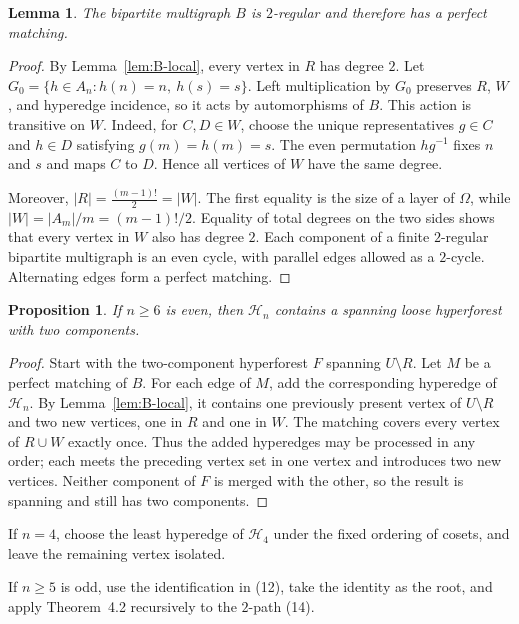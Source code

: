\documentclass[4pt]{article} %
\newtheorem{lemma}[theorem]{Lemma}
\newtheorem{proposition}[theorem]{Proposition}
\begin{document}
\begin{lemma}\label{lem:B-regular}
The bipartite multigraph $B$ is $2$-regular and therefore has a perfect
matching.
\end{lemma}

\begin{proof}
By Lemma~\ref{lem:B-local}, every vertex in $R$ has degree $2$. Let
$
 G_0=\{h\in A_n:h(n)=n,\ h(s)=s\}.
$
Left multiplication by $G_0$ preserves $R$, $W$, and hyperedge incidence,
so it acts by automorphisms of $B$. This action is transitive on $W$.
Indeed, for $C,D\in W$, choose the unique representatives $g\in C$ and
$h\in D$ satisfying $g(m)=h(m)=s$. The even permutation $hg^{-1}$ fixes
$n$ and $s$ and maps $C$ to $D$. Hence all vertices of $W$ have the same
degree.

Moreover,
$
 |R|=\frac{(m-1)!}{2}=|W|.
$
The first equality is the size of a layer of $\Omega$, while
$|W|=|A_m|/m=(m-1)!/2$. Equality of total degrees on the two sides shows
that every vertex in $W$ also has degree $2$. Each component of a finite
$2$-regular bipartite multigraph is an even cycle, with parallel edges
allowed as a $2$-cycle. Alternating edges form a perfect matching.
\end{proof}

\begin{proposition}\label{prop:even-forest}
If $n\geq6$ is even, then $\mathcal H_n$ contains a spanning loose
hyperforest with two components.
\end{proposition}

\begin{proof}
Start with the two-component hyperforest $F$ spanning $U\setminus R$. Let
$M$ be a perfect matching of $B$. For each edge of $M$, add the corresponding
hyperedge of $\mathcal H_n$. By Lemma~\ref{lem:B-local}, it contains one
previously present vertex of $U\setminus R$ and two new vertices, one in $R$
and one in $W$. The matching covers every vertex of $R\cup W$ exactly once.
Thus the added hyperedges may be processed in any order; each meets the
preceding vertex set in one vertex and introduces two new vertices. Neither
component of $F$ is merged with the other, so the result is spanning and
still has two components.
\end{proof}
If \(n=4\), choose the least hyperedge of \(\mathcal H_4\)
under the fixed ordering of cosets, and leave the remaining
vertex isolated.

If \(n\ge5\) is odd, use the identification in (12), take the identity
as the root, and apply Theorem~4.2 recursively to the \(2\)-path (14).
\end{document}
